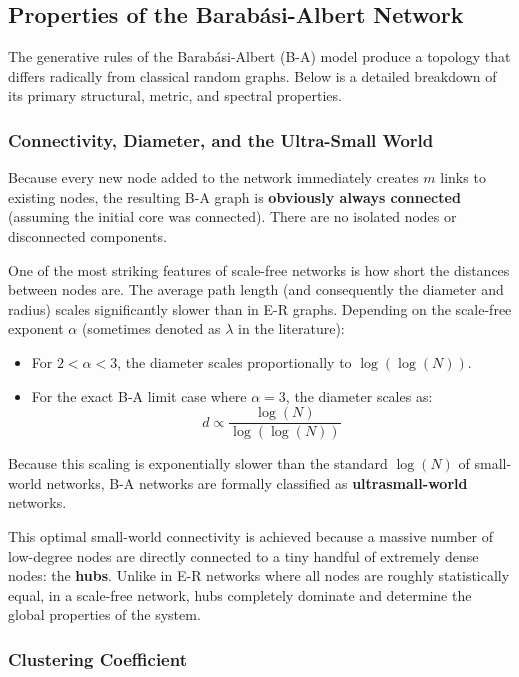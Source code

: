 \subsection{Properties of the Barabási-Albert Network}

The generative rules of the Barabási-Albert (B-A) model produce a topology that differs radically from classical random graphs. Below is a detailed breakdown of its primary structural, metric, and spectral properties.

\subsubsection{Connectivity, Diameter, and the Ultra-Small World}

Because every new node added to the network immediately creates \( m \) links to existing nodes, the resulting B-A graph is \textbf{obviously always connected} (assuming the initial core was connected). There are no isolated nodes or disconnected components.

One of the most striking features of scale-free networks is how short the distances between nodes are. The average path length (and consequently the diameter and radius) scales significantly slower than in E-R graphs. Depending on the scale-free exponent \( \alpha \) (sometimes denoted as \( \lambda \) in the literature):
\begin{itemize}
    \item For \( 2 < \alpha < 3 \), the diameter scales proportionally to \( \log(\log(N)) \).
    \item For the exact B-A limit case where \( \alpha = 3 \), the diameter scales as:
          \[
              d \propto \frac{\log(N)}{\log(\log(N))}
          \]
\end{itemize}
Because this scaling is exponentially slower than the standard \( \log(N) \) of small-world networks, B-A networks are formally classified as \textbf{ultrasmall-world} networks.

This optimal small-world connectivity is achieved because a massive number of low-degree nodes are directly connected to a tiny handful of extremely dense nodes: the \textbf{hubs}. Unlike in E-R networks where all nodes are roughly statistically equal, in a scale-free network, hubs completely dominate and determine the global properties of the system.

\subsubsection{Clustering Coefficient}

